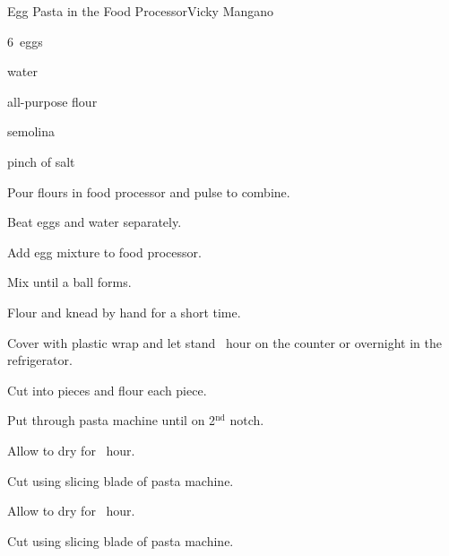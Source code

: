 \begin{recipe}{Egg Pasta in the Food Processor}{Vicky Mangano}{}

\begin{ingredients}
\item 6~eggs
\item \C{\quarter} water
\item {} all-purpose flour
\item {} semolina
\item pinch of salt
\end{ingredients}

\begin{directions}
\item Pour flours in food processor and pulse to combine.
\item Beat eggs and water separately.
\item Add egg mixture to food processor.
\item Mix until a ball forms.
\item Flour and knead by hand for a short time.
\item Cover with plastic wrap and let stand \half~hour on the counter or overnight in the refrigerator.
\item Cut into pieces and flour each piece.
\item Put through pasta machine until on 2$^{\mathrm{nd}}$ notch.
\item Allow to dry for \half~hour.
\item Cut using slicing blade of pasta machine.
\item Allow to dry for \half~hour.
\item Cut using slicing blade of pasta machine.
\end{directions}

\end{recipe}
